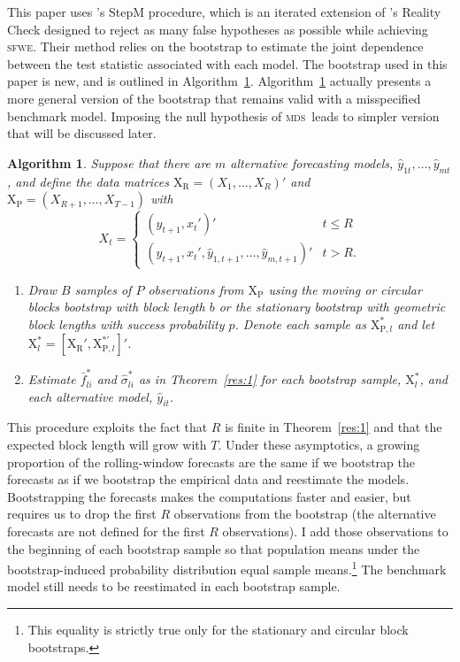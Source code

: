 \documentclass[11pt,fleqn]{article}
\newcommand\citepos[2][]{\citeauthor{#2}'s \citeyearpar[#1]{#2}}
\newtheorem{alg}{Algorithm}
\theoremstyle{definition}
\newcommand{\X}{\ensuremath{\mathrm{X}}}
\newcommand{\R}{\ensuremath{\mathrm{R}}}
\newcommand{\p}{\ensuremath{\mathrm{P}}}
\newcommand{\mds}{\textsc{mds}}
\newcommand{\sfwe}{\textsc{sfwe}}
\begin{document}
This paper uses \citepos{RoW:05} StepM procedure, which is an iterated
extension of \citepos{Whi:00} Reality Check designed to reject as many
false hypotheses as possible while achieving \sfwe.  Their method
relies on the bootstrap to estimate the joint dependence between the
test statistic associated with each model.  The bootstrap used in this
paper is new, and is outlined in Algorithm~\ref{alg:1}.
Algorithm~\ref{alg:1} actually presents a more general version of the
bootstrap that remains valid with a misspecified benchmark model.
Imposing the null hypothesis of \mds\ leads to simpler version that
will be discussed later.
\begin{alg}\label{alg:1}
  Suppose that there are $m$ alternative forecasting models,
  $\hat{y}_{1t},\dots, \hat{y}_{mt}$, and define the data matrices
  $\X_\R = (X_1,\dots,X_R)'$ and $\X_{\p} = (X_{R+1},\dots,X_{T-1})$
  with
  \begin{equation*}
    X_t = \begin{cases}
      (y_{t+1}, x_t')' & t \leq R \\
      (y_{t+1}, x_t', \hat{y}_{1,t+1}, \dots, \hat{y}_{m,t+1})' & t > R.
    \end{cases}
  \end{equation*}
  \begin{enumerate}
  \item Draw $B$ samples of $P$ observations from $\X_{\p}$ using the
    moving or circular blocks bootstrap with block length $b$ or the
    stationary bootstrap with geometric block lengths with success
    probability $p$.  Denote each sample as $\X_{\p, l}^{*}$ and let
    $\X_l^{*} = [\X_{\R}', \X_{\p,l}^{*\prime}]'$.
  \item Estimate $\bar{f}^{*}_{li}$ and $\hat{\sigma}_{li}^{*}$ as in
    Theorem~\ref{res:1} for each bootstrap sample, $\X^{*}_l$, and each
    alternative model, $\hat{y}_{it}$.
  \end{enumerate}
\end{alg}

This procedure exploits the fact that $R$ is finite in
Theorem~\ref{res:1} and that the expected block length will grow with
$T$.  Under these asymptotics, a growing proportion of the
rolling-window forecasts are the same if we bootstrap the forecasts as
if we bootstrap the empirical data and reestimate the models.
Bootstrapping the forecasts makes the computations faster and easier,
but requires us to drop the first $R$ observations from the bootstrap
(the alternative forecasts are not defined for the first $R$
observations).  I add those observations to the beginning of each
bootstrap sample so that population means under the bootstrap-induced
probability distribution equal sample means.\footnote{This equality is
  strictly true only for the stationary and circular block
  bootstraps.}  The benchmark model still needs to be reestimated in
each bootstrap sample.
\end{document}
